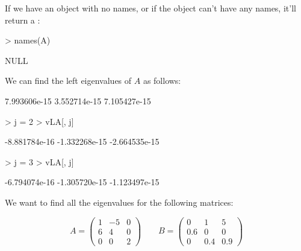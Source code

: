 \documentclass[11pt, oneside, reqno]{article}
\begin{document}
If we have an object with no names, or if the object can't have any names, it'll return a \verb@NULL@:

\begin{Schunk}
\begin{Sinput}
> names(A)
\end{Sinput}
\begin{Soutput}
NULL
\end{Soutput}
\end{Schunk}

\eans

We can find the left eigenvalues of $A$ as follows:

\begin{Schunk}
\begin{Soutput}
             [,1]         [,2]         [,3]
[1,] 7.993606e-15 3.552714e-15 7.105427e-15
\end{Soutput}
\begin{Sinput}
> j = 2
> vLA[, j] %
\end{Sinput}
\begin{Soutput}
              [,1]          [,2]          [,3]
[1,] -8.881784e-16 -1.332268e-15 -2.664535e-15
\end{Soutput}
\begin{Sinput}
> j = 3
> vLA[, j] %
\end{Sinput}
\begin{Soutput}
              [,1]          [,2]          [,3]
[1,] -6.794074e-16 -1.305720e-15 -1.123497e-15
\end{Soutput}
\end{Schunk}

\eans

We want to find all the eigenvalues for the following matrices:

\[
A= 
\begin{pmatrix}
	1&-5&0\\6&4&0\\0&0&2
\end{pmatrix}
\qquad
B=
\begin{pmatrix}
	0&1&5\\0.6&0&0\\0&0.4&0.9
\end{pmatrix}
\]
\end{document}
